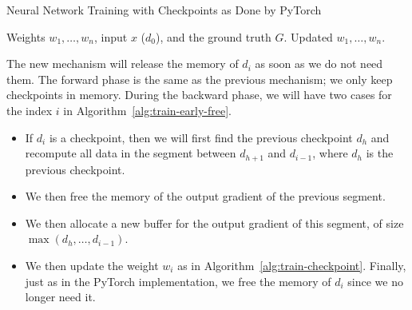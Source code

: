 \begin{algorithm}[h!t]
\begin{algorithmic}
\caption{Neural Network Training with Checkpoints as Done by PyTorch}
\label{alg:train-early-free}
\Require Weights $w_1, \ldots, w_n$, input $x$ ($d_0$), and the ground truth $G$.
\Ensure Updated $w_1, \ldots, w_n$.\\

             
    \EndIf
\EndFor
{}     
    \EndIf
     
     
\EndFor 
\end{algorithmic}
\end{algorithm}

The new mechanism will release the memory of $d_i$ as soon as we do not need them.
The forward phase is the same as the previous mechanism; we only keep checkpoints in memory.
During the backward phase, we will have two cases for the index $i$ in Algorithm~\ref{alg:train-early-free}.

\begin{itemize}
\item If $d_i$ is a checkpoint, then we will first find the previous checkpoint $d_{h}$ and recompute all data in the segment between $d_{h+1}$ and $d_{i-1}$, where $d_h$ is the previous checkpoint.
\item We then free the memory of the output gradient of the previous segment.
\item We then allocate a new buffer for the output gradient of this segment, of size $\max(d_{h}, \ldots, d_{i-1})$.
\item We then update the weight $w_i$ as in Algorithm~\ref{alg:train-checkpoint}.
Finally, just as in the PyTorch implementation, we free the memory of $d_{i}$ since we no longer need it.
\end{itemize}

